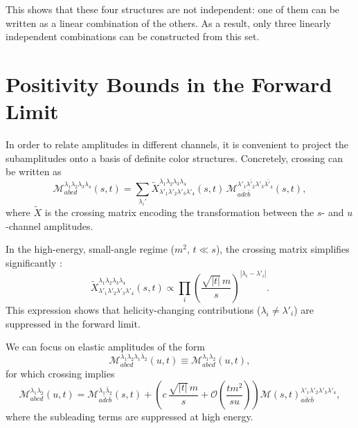 This shows that these four structures are not independent: one of them can be written as a linear combination of the others. As a result, only three linearly independent combinations can be constructed from this set.

\section{Positivity Bounds in the Forward Limit}
\label{sec:forwardlimit}
In order to relate amplitudes in different channels, it is convenient to project the subamplitudes onto a basis of definite color structures. 
Concretely, crossing can be written as
\begin{equation}
    \mathcal{M}^{\lambda_1 \lambda_2 \lambda_3 \lambda_4}_{abcd} (s, t) = \sum_{\lambda_i'} 
    \tilde{X}_{\lambda'_1 \lambda'_2 \lambda'_3 \lambda'_4}^{\lambda_1 \lambda_2 \lambda_3 \lambda_4} (s, t)\,
    \mathcal{M}_{a \bar{d} c \bar{b}}^{\lambda'_1 \bar{\lambda'_2} \lambda'_3 \bar{\lambda'_4}}(s,t),
\end{equation}
where $\tilde{X}$ is the crossing matrix encoding the transformation between the $s$- and $u$-channel amplitudes.

In the high-energy, small-angle regime ($m^2,\, t \ll s$), the crossing matrix simplifies significantly \autocite{Bellazzini:2023nqj}:
\begin{equation}
    \tilde{X}_{\lambda'_1 \lambda'_2 \lambda'_3 \lambda'_4}^{\lambda_1 \lambda_2 \lambda_3 \lambda_4} (s, t)
    \propto \prod_{i} \left( \frac{\sqrt{|t|}\, m}{s} \right)^{|\lambda_i - \lambda'_i|}.
\end{equation}
This expression shows that helicity-changing contributions ($\lambda_i \neq \lambda'_i$) are suppressed in the forward limit.

We can focus on elastic amplitudes of the form
\begin{equation}
    \mathcal{M}^{\lambda_1 \lambda_2 \lambda_1 \lambda_2}_{abcd} (u, t)
    \equiv \mathcal{M}^{\lambda_1 \lambda_2}_{abcd} (u, t),
\end{equation}
for which crossing implies
\begin{equation}
    \mathcal{M}^{\lambda_1 \lambda_2}_{abcd} (u, t)
    = \mathcal{M}^{\lambda_1 \bar{\lambda}_2}_{a \bar{d} c \bar{b}} (s, t)
    + \left( c\, \frac{\sqrt{|t|}\, m}{s} + \mathcal{O}\!\left(\frac{t m^2}{s u}\right) \right)
    \mathcal{M}(s,t)_{a \bar{d} c \bar{b}}^{\lambda'_1 \lambda'_2 \lambda'_3 \lambda'_4},
\end{equation}
where the subleading terms are suppressed at high energy.

